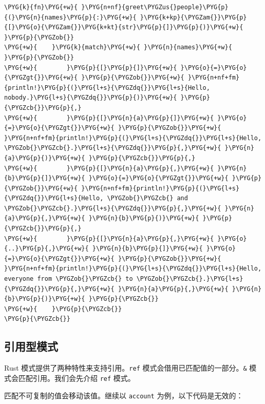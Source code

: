 \begin{Verbatim}[commandchars=\\\{\},breaklines=true,breakanywhere=true,fontsize=\codefont,xleftmargin=17bp]
\PYG{k}{fn}\PYG{+w}{ }\PYG{n+nf}{greet\PYGZus{}people}\PYG{p}{(}\PYG{n}{names}\PYG{p}{:}\PYG{+w}{ }\PYG{k+kp}{\PYGZam{}}\PYG{p}{[}\PYG{o}{\PYGZam{}}\PYG{k+kt}{str}\PYG{p}{]}\PYG{p}{)}\PYG{+w}{ }\PYG{p}{\PYGZob{}}
\PYG{+w}{    }\PYG{k}{match}\PYG{+w}{ }\PYG{n}{names}\PYG{+w}{ }\PYG{p}{\PYGZob{}}
\PYG{+w}{        }\PYG{p}{[}\PYG{p}{]}\PYG{+w}{ }\PYG{o}{=}\PYG{o}{\PYGZgt{}}\PYG{+w}{ }\PYG{p}{\PYGZob{}}\PYG{+w}{ }\PYG{n+nf+fm}{println!}\PYG{p}{(}\PYG{l+s}{\PYGZdq{}}\PYG{l+s}{Hello, nobody.}\PYG{l+s}{\PYGZdq{}}\PYG{p}{)}\PYG{+w}{ }\PYG{p}{\PYGZcb{}}\PYG{p}{,}
\PYG{+w}{        }\PYG{p}{[}\PYG{n}{a}\PYG{p}{]}\PYG{+w}{ }\PYG{o}{=}\PYG{o}{\PYGZgt{}}\PYG{+w}{ }\PYG{p}{\PYGZob{}}\PYG{+w}{ }\PYG{n+nf+fm}{println!}\PYG{p}{(}\PYG{l+s}{\PYGZdq{}}\PYG{l+s}{Hello, \PYGZob{}\PYGZcb{}.}\PYG{l+s}{\PYGZdq{}}\PYG{p}{,}\PYG{+w}{ }\PYG{n}{a}\PYG{p}{)}\PYG{+w}{ }\PYG{p}{\PYGZcb{}}\PYG{p}{,}
\PYG{+w}{        }\PYG{p}{[}\PYG{n}{a}\PYG{p}{,}\PYG{+w}{ }\PYG{n}{b}\PYG{p}{]}\PYG{+w}{ }\PYG{o}{=}\PYG{o}{\PYGZgt{}}\PYG{+w}{ }\PYG{p}{\PYGZob{}}\PYG{+w}{ }\PYG{n+nf+fm}{println!}\PYG{p}{(}\PYG{l+s}{\PYGZdq{}}\PYG{l+s}{Hello, \PYGZob{}\PYGZcb{} and \PYGZob{}\PYGZcb{}.}\PYG{l+s}{\PYGZdq{}}\PYG{p}{,}\PYG{+w}{ }\PYG{n}{a}\PYG{p}{,}\PYG{+w}{ }\PYG{n}{b}\PYG{p}{)}\PYG{+w}{ }\PYG{p}{\PYGZcb{}}\PYG{p}{,}
\PYG{+w}{        }\PYG{p}{[}\PYG{n}{a}\PYG{p}{,}\PYG{+w}{ }\PYG{o}{..}\PYG{p}{,}\PYG{+w}{ }\PYG{n}{b}\PYG{p}{]}\PYG{+w}{ }\PYG{o}{=}\PYG{o}{\PYGZgt{}}\PYG{+w}{ }\PYG{p}{\PYGZob{}}\PYG{+w}{ }\PYG{n+nf+fm}{println!}\PYG{p}{(}\PYG{l+s}{\PYGZdq{}}\PYG{l+s}{Hello, everyone from \PYGZob{}\PYGZcb{} to \PYGZob{}\PYGZcb{}.}\PYG{l+s}{\PYGZdq{}}\PYG{p}{,}\PYG{+w}{ }\PYG{n}{a}\PYG{p}{,}\PYG{+w}{ }\PYG{n}{b}\PYG{p}{)}\PYG{+w}{ }\PYG{p}{\PYGZcb{}}
\PYG{+w}{    }\PYG{p}{\PYGZcb{}}
\PYG{p}{\PYGZcb{}}
\end{Verbatim}

\subsection{引用型模式}

Rust 模式提供了两种特性来支持引用。\texttt{ref} 模式会借用已匹配值的一部分。\texttt{\&} 模式会匹配引用。我们会先介绍 \texttt{ref} 模式。

匹配不可复制的值会移动该值。继续以 \texttt{account} 为例，以下代码是无效的：

